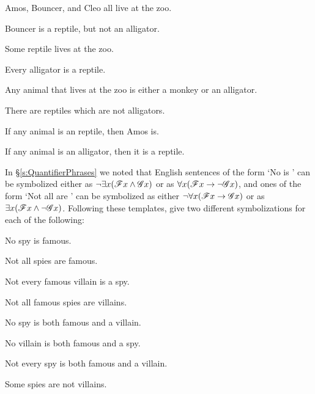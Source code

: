 \begin{earg}
\item Amos, Bouncer, and Cleo all live at the zoo.
\item Bouncer is a reptile, but not an alligator.
\item Some reptile lives at the zoo.
\item Every alligator is a reptile.
\item Any animal that lives at the zoo is either a monkey or an alligator.
\item There are reptiles which are not alligators.
\item If any animal is an reptile, then Amos is.
\item If any animal is an alligator, then it is a reptile.
\end{earg}


\problempart
In \S\ref{s:QuantifierPhrases} we noted that English sentences of the form `No  is ' can be symbolized either as $\neg \exists x (\mathscr{F}x \wedge \mathscr{G}x)$ or as $\forall x(\mathscr{F}x \rightarrow \neg \mathscr{G}x)$, and ones of the form `Not all  are ' can be symbolized as either $\neg \forall x(\mathscr{F}x \rightarrow \mathscr{G}x)$ or as $\exists x(\mathscr{F}x \wedge \neg \mathscr{G}x)$.  Following these templates, give two different symbolizations for each of the following:

\begin{earg}
\item No spy is famous.
\item Not all spies are famous.
\item Not every famous villain is a spy.
\item Not all famous spies are villains.
\item No spy is both famous and a villain.
\item No villain is both famous and a spy.
\item Not every spy is both famous and a villain.
\item Some spies are not villains.
\end{earg}


